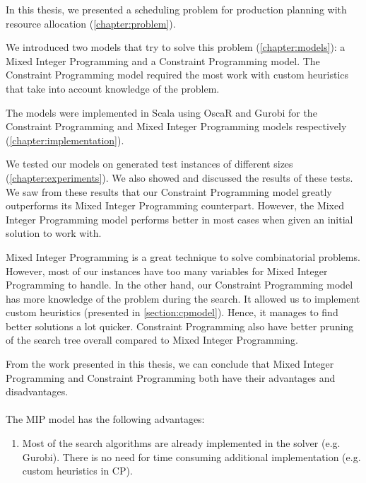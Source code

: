 \documentclass[../thesis.tex]{subfiles}
\begin{document}
In this thesis, we presented a scheduling problem for production planning 
with resource allocation (\autoref{chapter:problem}).

We introduced two models that try to solve
this problem (\autoref{chapter:models}): a Mixed Integer Programming and a Constraint Programming model.
The Constraint Programming model required the most work with custom heuristics that take into account knowledge of the problem.

The models were implemented in Scala using OscaR and Gurobi for the Constraint Programming and Mixed Integer Programming models respectively (\autoref{chapter:implementation}).

We tested our models on generated test instances of different sizes (\autoref{chapter:experiments}).
We also showed and discussed the results of these tests. We saw from these results that our Constraint Programming model greatly outperforms
its Mixed Integer Programming counterpart.
However, the Mixed Integer Programming model performs better in most cases when given an initial solution 
to work with.


Mixed Integer Programming is a great technique to solve combinatorial problems. However, most of our 
instances have too many variables for Mixed Integer Programming to handle.
In the other hand,
our Constraint Programming model has more knowledge of the problem during the search. 
It allowed us to implement custom heuristics (presented in \autoref{section:cpmodel}). Hence, it manages to find 
better solutions a lot quicker. Constraint Programming also have better pruning of the search tree overall compared to Mixed Integer Programming.


From the work presented in this thesis, we can conclude that Mixed Integer Programming and Constraint Programming both have their advantages and disadvantages.

\paragraph{}

The MIP model has the following advantages:
\begin{enumerate}[leftmargin=1.5cm,noitemsep]
  \item Most of the search algorithms are already implemented in the solver (e.g. Gurobi).
  There is no need for time consuming additional implementation (e.g. custom heuristics in CP).
\end{enumerate}
\end{document}
